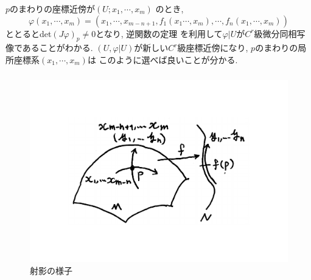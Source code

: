 \documentclass[dvipdfmx,cjk]{beamer}
\theoremstyle{definition}
\begin{document}
\begin{frame}
  $p$のまわりの座標近傍が$(U;x_1, \cdots ,x_m)$
  のとき, 
  $$\varphi(x_1,\cdots ,x_m)=
  (x_1,\cdots ,x_{m-n+1},f_1(x_1\cdots ,x_m),\cdots
  ,f_n(x_1,\cdots ,x_m))$$
  ととるとdet$(J\varphi)_p\neq 0$となり, 逆関数の定理
  を利用して$\varphi|U$が$C^r$級微分同相写像であることがわかる. 
  $(U,\varphi|U)$が新しい$C^r$級座標近傍になり, 
  $p$のまわりの局所座標系$(x_1,\cdots ,x_m)$は
  このように選べば良いことが分かる.
  \frametitle{}
  \begin{figure}[H]
    \centering
    \includegraphics[keepaspectratio, scale=0.35]{projection_new.pdf}
    \caption{射影の様子}
    \label{projectionTheorem}
   \end{figure}
\end{frame}
\end{document}

